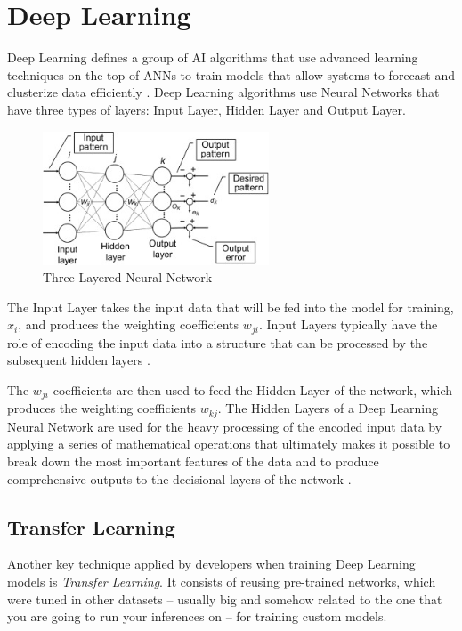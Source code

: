 \documentclass[openright]{normas-utf-tex} %
\begin{document}
\section{Deep Learning}

Deep Learning defines a group of AI algorithms that use advanced learning techniques on the 
top of ANNs to train models that allow systems to forecast and clusterize data 
efficiently \cite{IBMDeepLearning}.
Deep Learning algorithms use Neural Networks that have three types of layers:
Input Layer, Hidden Layer and Output Layer.
        
\begin{figure}[H]
	\centering
	\includegraphics[width=0.6\textwidth]{./images/three-layered-ann.jpg}
	\caption[Three Layered Neural Network]{Three Layered Neural Network}
	\label{fig:threeLayeredAnn}
\end{figure}

The Input Layer takes the input data that will be fed into the model for training,
$x_i$, and produces the weighting coefficients $w_{ji}$. Input Layers
typically have the role of encoding the input data into a structure that can be processed by the 
subsequent hidden layers \cite{Paranjape2020}.

The $w_{ji}$ coefficients are then used to feed the Hidden Layer of the network,
which produces the weighting coefficients $w_{kj}$. The Hidden Layers of a Deep Learning 
Neural Network are used for the heavy processing of the encoded input data by applying a series of 
mathematical operations that ultimately makes it possible to break down the most important features
of the data and to produce comprehensive outputs to the decisional layers of the network
\cite{DeepAI_HiddenLayer}.

\subsection{Transfer Learning}

Another key technique applied by developers when training Deep Learning models is
\textit{Transfer Learning}. 
It consists of reusing pre-trained networks, which were tuned in other datasets -- usually big and
somehow related to the one that you are going to run your inferences on -- for training custom models.
\end{document}
